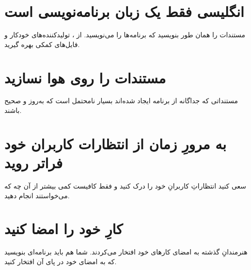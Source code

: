 \documentclass[10pt, a4paper]{book}
\begin{document}
    \section{انگلیسی فقط یک زبان برنامه‌نویسی است}
    مستندات را همان طور بنویسید که برنامه‌ها را می‌نویسید. از ، تولیدکننده‌های خودکار و فایل‌های کمکی بهره گیرید.

    \section{مستندات را روی هوا نسازید}
    مستنداتی که جداگانه از برنامه ایجاد شده‌اند بسیار نامحتمل است که به‌روز و صحیح باشند.

    \section{به مرورِ زمان از انتظارات کاربران خود فراتر روید}
    سعی کنید انتظاراتِ کاربرانِ خود را درک کنید و فقط کافیست کمی بیشتر از آن چه که می‌خواستند انجام دهید.

    \section{کارِ خود را امضا کنید}
    هنرمندانِ گذشته به امضای کارهای خود افتخار می‌کردند. شما هم باید برنامه‌ای بنویسید که به امضای خود در پای آن افتخار کنید.
\end{document}
